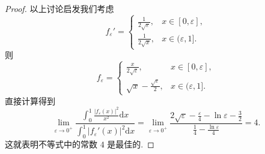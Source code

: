 \documentclass[../../main.tex]{subfiles}
\begin{document}
\begin{proof}
以上讨论启发我们考虑
$$f_\varepsilon' = \begin{cases} 
\frac{1}{2\sqrt{\varepsilon}}, & x \in [0, \varepsilon], \\
\frac{1}{2\sqrt{x}}, & x \in (\varepsilon, 1].
\end{cases}$$
则
$$f_\varepsilon = \begin{cases} 
\frac{x}{2\sqrt{\varepsilon}}, & x \in [0, \varepsilon], \\
\sqrt{x} - \frac{\sqrt{\varepsilon}}{2}, & x \in (\varepsilon, 1].
\end{cases}$$
直接计算得到
$$\lim_{\varepsilon \to 0^+} \frac{\int_0^1 \frac{|f_\varepsilon(x)|^2}{x^2} \mathrm{d}x}{\int_0^1 |f_\varepsilon'(x)|^2 \mathrm{d}x} = \lim_{\varepsilon \to 0^+} \frac{2\sqrt{\varepsilon} - \frac{\varepsilon}{4} - \ln \varepsilon - \frac{3}{2}}{\frac{1}{4} - \frac{\ln \varepsilon}{4}} = 4.$$
这就表明不等式中的常数 $4$ 是最佳的.

\end{proof}
\end{document}
